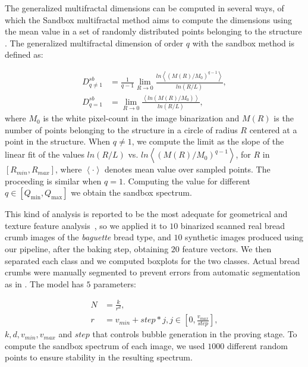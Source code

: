 \documentclass[spanish,a4paper,openright,11pt]{book}
\begin{document}
The generalized multifractal dimensions can be computed in several ways, of which the Sandbox multifractal method \cite{Tel1989} aims to compute the dimensions using the mean value in a set of randomly distributed points belonging to the structure \cite{Debartolo2004}. 
The generalized multifractal dimension of order $q$ with the sandbox method is defined as:

 \begin{align*}
D_{q\ne 1}^{sb} &= \frac{1}{q-1} \lim_{R \rightarrow 0}{
\frac{ln   { \left\langle  (M(R)/M_{0})^{q-1} \right\rangle   }}
{ln {(R/L)}       }},\\
D_{q=1}^{sb} &= \lim_{R \rightarrow 0}{
\frac{ \left\langle ln   { (M(R)/M_{0})  }  \right\rangle}
{ln {(R/L)}       }},
\end{align*}
%
where $M_{0}$ is the white pixel-count in the image binarization and  $M(R)$ is the number of points belonging to the structure in a circle of radius $R$ centered at a point in the structure. 
When $q\ne1$, we compute the limit as the slope of the linear fit of the values $ln(R/L)$ vs. $ ln  \left\langle  { (M(R)/M_{0})^{q-1} }  \right\rangle$, for $R$ in $[R_{min}, R_{max}]$, where $ \left\langle \cdot  \right\rangle$ denotes mean value over sampled points. 
The proceeding is similar when $q=1$. 
Computing the value for different $q \in [Q_{\min},Q_{\max}]$  we obtain the sandbox spectrum. %

This kind of analysis is reported to be the most adequate for geometrical and texture feature analysis~\cite{Gonzales2008,Baravalle2012}, so we applied it to $10$ binarized scanned real bread crumb images of the {\em baguette} bread type, and $10$ synthetic images produced using our pipeline, after the baking step, obtaining $20$ feature vectors.
We then separated each class and we computed boxplots for the two classes.
Actual bread crumbs were manually segmented to prevent errors from automatic segmentation as in \cite{Bosch2011}.
The model has $5$ parameters:

\begin{align*}
N &= \frac{k}{r^{d}},\\ r &= v_{min}+step*j, j \in [0,\frac{v_{max}}{step}],
\end{align*}
$k,d,v_{min},v_{max}$ and $step$ that controls bubble generation in the proving stage.
To compute the sandbox spectrum of each image, we used $1000$ different random points to ensure stability in the resulting spectrum.
\end{document}
